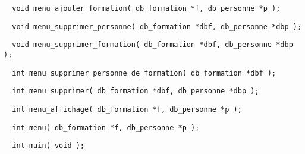 \documentclass[11pt]{article}
\begin{document}
\begin{lstlisting}
  void menu_ajouter_formation( db_formation *f, db_personne *p );
\end{lstlisting}

\begin{lstlisting}
  void menu_supprimer_personne( db_formation *dbf, db_personne *dbp );
\end{lstlisting}

\begin{lstlisting}
  void menu_supprimer_formation( db_formation *dbf, db_personne *dbp );
\end{lstlisting}

\begin{lstlisting}
  int menu_supprimer_personne_de_formation( db_formation *dbf );
\end{lstlisting}

\begin{lstlisting}
  int menu_supprimer( db_formation *dbf, db_personne *dbp );
\end{lstlisting}

\begin{lstlisting}
  int menu_affichage( db_formation *f, db_personne *p );
\end{lstlisting}

\begin{lstlisting}
  int menu( db_formation *f, db_personne *p );
\end{lstlisting}

\begin{lstlisting}
  int main( void );
\end{lstlisting}

\newpage
\printglossary
\end{document}
